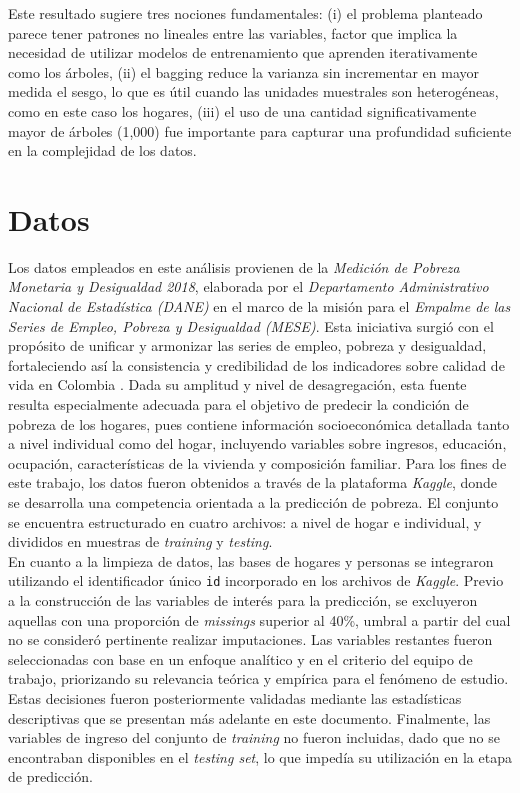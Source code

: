 \documentclass[12pt,a4paper,onecolumn]{article}
\begin{document}
Este resultado sugiere tres nociones fundamentales: (i) el problema planteado parece tener patrones no lineales entre las variables, factor que implica la necesidad de utilizar modelos de entrenamiento que aprenden iterativamente como los árboles, (ii) el bagging reduce la varianza sin incrementar en mayor medida el sesgo, lo que es útil cuando las unidades muestrales son heterogéneas, como en este caso los hogares, (iii) el uso de una cantidad significativamente mayor de árboles (1,000) fue importante para capturar una profundidad suficiente en la complejidad de los datos.\\

\section{Datos} \label{sec:datos}
Los datos empleados en este análisis provienen de la \textit{Medición de Pobreza Monetaria y Desigualdad 2018}, elaborada por el \textit{Departamento Administrativo Nacional de Estadística (DANE)} en el marco de la misión para el \textit{Empalme de las Series de Empleo, Pobreza y Desigualdad (MESE)}. Esta iniciativa surgió con el propósito de unificar y armonizar las series de empleo, pobreza y desigualdad, fortaleciendo así la consistencia y credibilidad de los indicadores sobre calidad de vida en Colombia \citep{DANE2018}. Dada su amplitud y nivel de desagregación, esta fuente resulta especialmente adecuada para el objetivo de predecir la condición de pobreza de los hogares, pues contiene información socioeconómica detallada tanto a nivel individual como del hogar, incluyendo variables sobre ingresos, educación, ocupación, características de la vivienda y composición familiar. Para los fines de este trabajo, los datos fueron obtenidos a través de la plataforma \textit{Kaggle}, donde se desarrolla una competencia orientada a la predicción de pobreza. El conjunto se encuentra estructurado en cuatro archivos: a nivel de hogar e individual, y divididos en muestras de \textit{training} y \textit{testing}.\\

En cuanto a la limpieza de datos, las bases de hogares y personas se integraron utilizando el identificador único \texttt{id} incorporado en los archivos de \textit{Kaggle}. Previo a la construcción de las variables de interés para la predicción, se excluyeron aquellas con una proporción de \textit{missings} superior al 40\%, umbral a partir del cual no se consideró pertinente realizar imputaciones. Las variables restantes fueron seleccionadas con base en un enfoque analítico y en el criterio del equipo de trabajo, priorizando su relevancia teórica y empírica para el fenómeno de estudio. Estas decisiones fueron posteriormente validadas mediante las estadísticas descriptivas que se presentan más adelante en este documento. Finalmente, las variables de ingreso del conjunto de \textit{training} no fueron incluidas, dado que no se encontraban disponibles en el \textit{testing set}, lo que impedía su utilización en la etapa de predicción.\\
\end{document}
